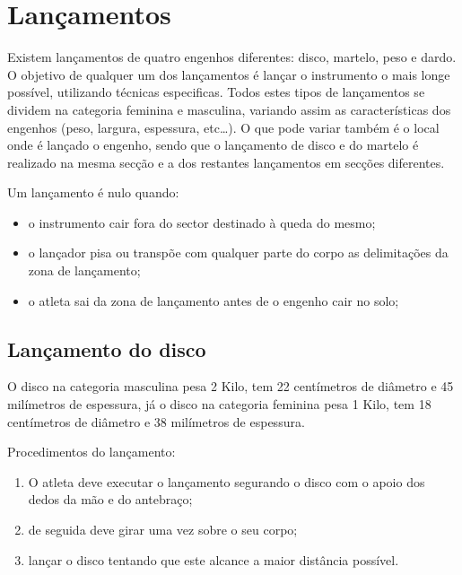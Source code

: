 \documentclass{report}
\begin{document}
            \cite{salto}


               
    
    \section{Lançamentos}
    Existem lançamentos de quatro engenhos diferentes: disco, martelo, peso e dardo. O objetivo de qualquer um dos lançamentos é lançar o instrumento o mais longe possível, utilizando técnicas especificas. Todos estes tipos de lançamentos se dividem na categoria feminina e masculina, variando assim as características dos engenhos (peso, largura, espessura, etc…). O que pode variar também é o local onde é lançado o engenho, sendo que o lançamento de disco e do martelo é realizado na mesma secção e a dos restantes lançamentos em secções diferentes. \par
    Um lançamento é nulo quando:
    \begin{itemize}
        \item 
        o instrumento cair fora do sector destinado à queda do mesmo;
        \item
        o lançador pisa ou transpõe com qualquer parte do corpo as delimitações da zona de lançamento;
        \item
        o atleta sai da zona de lançamento antes de o engenho cair no solo;
        
    \end{itemize}
    
    
        \subsection{Lançamento do disco}
        O disco na categoria masculina pesa 2 Kilo, tem 22 centímetros de diâmetro e 45 milímetros de espessura, já o disco na categoria feminina pesa 1 Kilo, tem 18 centímetros de diâmetro e 38 milímetros de espessura.\par
        Procedimentos do lançamento:
        \begin{enumerate}
            \item O atleta deve executar o lançamento segurando o disco com o apoio dos dedos da mão e do antebraço;
            \item de seguida deve girar uma vez sobre o seu corpo;
            \item lançar o disco tentando que este alcance a maior distância possível.
        \end{enumerate} \cite{lancamentodisco}
\end{document}

